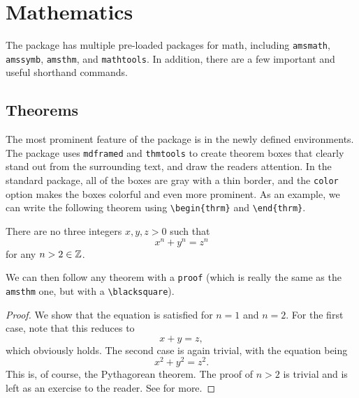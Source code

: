 \documentclass[11pt]{article}
\begin{document}
\section{Mathematics}
The package has multiple pre-loaded packages for math, including \texttt{amsmath}, \texttt{amssymb}, \texttt{amsthm}, and \texttt{mathtools}. In addition, there are a few important and useful shorthand commands.

\subsection{Theorems}
The most prominent feature of the package is in the newly defined environments. The package uses \texttt{mdframed} and \texttt{thmtools} to create theorem boxes that clearly stand out from the surrounding text, and draw the readers attention. In the standard package, all of the boxes are gray with a thin border, and the \texttt{color} option makes the boxes colorful and even more prominent. As an example, we can write the following theorem using \verb|\begin{thrm}| and \verb|\end{thrm}|.
\begin{thrm}
	There are no three integers $x,y,z > 0$ such that
	\[x^n + y^n = z^n\]
	for any $n > 2 \in \mathbb{Z}$.
\end{thrm}
We can then follow any theorem with a \verb|proof| (which is really the same as the \texttt{amsthm} one, but with a \verb|\blacksquare|).

\begin{proof}
	We show that the equation is satisfied for $n = 1$ and $n = 2$. For the first case, note that this reduces to
	\[x + y = z,\]
	which obviously holds. The second case is again trivial, with the equation being
	\[x^2 + y^2 = z^2.\]
	This is, of course, the Pythagorean theorem. The proof of $n > 2$ is trivial and is left as an exercise to the reader. See \cite{wiles1995} for more.
\end{proof}
\end{document}
